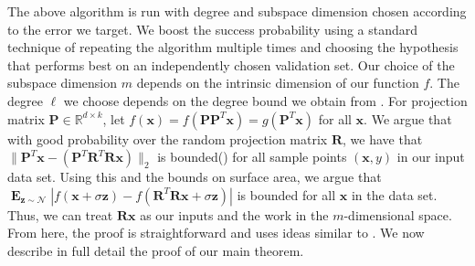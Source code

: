 \documentclass[10pt,a4paper]{article}
\newcommand\twonorm[1]{\|#1\|_2}
\renewcommand\vec[1]{\mathbf{#1}}
\DeclareMathOperator*{\pr}{\mathbf{Pr}}
\DeclareMathOperator*{\E}{\mathbf{E}}
\newcommand{\R}{\mathbb{R}}
\newcommand{\1}{\Ind}
\newcommand{\x}{\vec x}
\newcommand{\vv}{\vec v}
\newcommand{\vu}{\vec u}
\newcommand{\z}{\vec z}
\newcommand{\Gauss}{\mathcal{N}}
\begin{document}
The above algorithm is run with degree and subspace dimension chosen according to the error we target.  We boost the success probability using a standard technique of repeating the algorithm multiple times and choosing the hypothesis that performs best on an independently chosen validation set. Our choice of the subspace dimension $m$ depends on the intrinsic dimension of our function $f$. The degree $\ell$ we choose depends on the degree bound we obtain from . For projection matrix $\vec P\in \R^{d\times k}$, let $f(\x)=f(\vec P\vec P^T\x)=g(\vec P^T\x)$ for all $\x$. We argue that with good probability over the random projection matrix $\vec R$, we have that $\twonorm{\vec P^T\x-(\vec P^T\vec R^T\vec R \x)}$ is bounded() for all sample points $(\x,y)$ in our input data set. Using this and the bounds on surface area, we argue that $\E_{\z\sim \Gauss}|f(\x+\sigma \z)-f(\vec R^T\vec R\x+\sigma \z)|$ is bounded for all $\x$ in the data set. Thus, we can treat $\vec R\x$ as our inputs and the work in the $m$-dimensional space. From here, the proof is straightforward and uses ideas similar to \cite{KKMS:05}. We now describe in full detail the proof of our main theorem.





\end{document}
